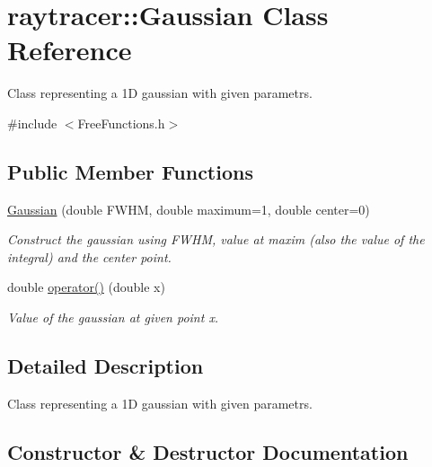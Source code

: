 \hypertarget{classraytracer_1_1Gaussian}{}\section{raytracer\+:\+:Gaussian Class Reference}
\label{classraytracer_1_1Gaussian}


Class representing a 1D gaussian with given parametrs.  




{\ttfamily \#include $<$Free\+Functions.\+h$>$}

\subsection*{Public Member Functions}
\begin{DoxyCompactItemize}
\item 
\hyperlink{classraytracer_1_1Gaussian_ac8b11a424ae009492e40351452a77949}{Gaussian} (double F\+W\+HM, double maximum=1, double center=0)
\begin{DoxyCompactList}\small\item\em Construct the gaussian using F\+W\+HM, value at maxim (also the value of the integral) and the center point. \end{DoxyCompactList}\item 
double \hyperlink{classraytracer_1_1Gaussian_ac4bbe17132daa8b89dc431c353efc205}{operator()} (double x)
\begin{DoxyCompactList}\small\item\em Value of the gaussian at given point x. \end{DoxyCompactList}\end{DoxyCompactItemize}


\subsection{Detailed Description}
Class representing a 1D gaussian with given parametrs. 

\subsection{Constructor \& Destructor Documentation}
\mbox{\label{classraytracer_1_1Gaussian_ac8b11a424ae009492e40351452a77949}} 
